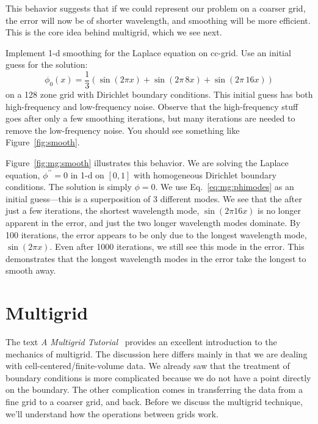 This behavior suggests that if we could represent our problem on a
coarser grid, the error will now be of shorter wavelength, and
smoothing will be more efficient.  This is the core idea behind
multigrid, which we see next.

\begin{exercise}
{Implement 1-d smoothing for the Laplace equation on
  cc-grid.  Use an initial guess for the solution:
  \begin{equation}
    \label{eq:mg:phimodes}
  \phi_0(x) = \frac{1}{3} ( \sin(2\pi x) + \sin(2\pi \, 8 x) + \sin(2\pi \, 16 x) )
  \end{equation}
  on a 128 zone grid with Dirichlet boundary conditions.  This initial
  guess has both high-frequency and low-frequency noise.  Observe that
  the high-frequency stuff goes after only a few smoothing iterations,
  but many iterations are needed to remove the low-frequency noise.
  You should see something like Figure~\ref{fig:smooth}.
}
\end{exercise}

Figure~\ref{fig:mg:smooth} illustrates this behavior.  We are solving
the Laplace equation, $\phi^{\prime\prime} = 0$ in 1-d on $[0,1]$ with
homogeneous Dirichlet boundary conditions.  The solution is simply
$\phi = 0$.  We use Eq.~\ref{eq:mg:phimodes} as an initial guess---this is a superposition
of 3 different modes.  We see that the after just a few iterations, the 
shortest wavelength mode, $\sin(2\pi 16x)$ is no longer apparent in the error,
and just the two longer wavelength modes dominate.  By 100 iterations,
the error appears to be only due to the longest wavelength mode, $\sin(2\pi x)$.
Even after 1000 iterations, we still see this mode in the error.  This 
demonstrates that the longest wavelength modes in the error take the
longest to smooth away.

\section{Multigrid}

The text {\em A Multigrid Tutorial}~\cite{multigridtutorial} provides
an excellent introduction to the mechanics of multigrid.  The
discussion here differs mainly in that we are dealing with
cell-centered/finite-volume data.  We already saw that the treatment
of boundary conditions is more complicated because we do not have a
point directly on the boundary.  The other complication comes in
transferring the data from a fine grid to a coarser grid, and back.
Before we discuss the multigrid technique, we'll understand how
the operations between grids work.


